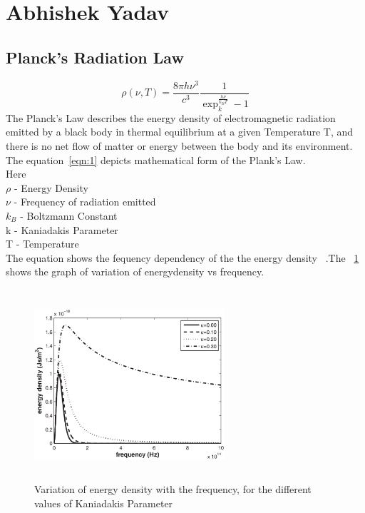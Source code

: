 

\section{Abhishek Yadav}
\subsection{Planck's Radiation Law}
\begin{equation}
	\rho(\nu,T)={\frac{8 \pi h \nu^3}{c^3}}  {\frac{1}{\exp_k^{\frac{h \nu}{k_BT}} - 1}}
	\label{eqn:1}
\end{equation}
The Planck's Law describes the energy density of electromagnetic radiation emitted by a black body in thermal equilibrium at a given Temperature T, and there is no net flow of matter or energy between the body and its environment.
The equation~\ref{eqn:1} depicts mathematical form of the Plank's Law. \\
Here \\
$\rho$ - Energy Density \\
$\nu$  - Frequency of radiation emitted \\
$k_B$  -  Boltzmann Constant \\
k      -  Kaniadakis Parameter \\
T      - Temperature \\
The equation shows the fequency dependency of the the energy density ~\cite{meb008}.The ~\ref{fig:me20b008} shows the graph of variation of energydensity vs frequency.
\begin{figure}[h]
        \begin{center}
		\includegraphics[width=200pt,height=200pt]{me20b008.eps}
		\end{center}
        \caption{Variation of energy density with the frequency, for the different values of Kaniadakis Parameter}
        \label{fig:me20b008}
\end{figure}


